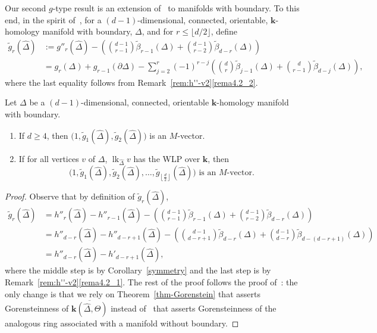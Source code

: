 \documentclass[ALCO,ThmDefs,Unicode,epreuves]{cedram}
\DeclareMathOperator\lk{lk}
\newcommand{\complet}[1]{\hat{#1}}
\newcommand{\field}{\mathbf{k}}
\newcommand{\halffloor}{\left\lfloor \frac{d}{2}\right\rfloor}
\begin{document}
Our second $g$-type result is an extension of~\cite[Theorem~5.4(i)]{Murai-Nevo-14} to manifolds with boundary. To this end, in the spirit of~\cite[Section~5]{Murai-Nevo-14}, for a $(d-1)$-dimensional, connected, orientable, $\field$-homology manifold with boundary, $\Delta$, and for $r\leq \lfloor d/2\rfloor$, define 
\begin{align} 
\tilde{g}_r(\complet{\Delta})&:=g''_r(\complet{\Delta})-\left(\binom{d-1}{r-1}\tilde{\beta}_{r-1}(\Delta)+\binom{d-1}{r-2}\tilde{\beta}_{d-r}(\Delta)\right)\\
&=g_r(\Delta)+g_{r-1}(\partial\Delta)-\sum_{j=2}^r(-1)^{r-j}\left(\binom{d}{r}\tilde{\beta}_{j-1}(\Delta)+ \binom{d}{r-1}\tilde{\beta}_{d-j}(\Delta)\right), \label{g-tilde}
\end{align}
where the last equality follows from Remark~\ref{rem:h''-v2}\eqref{rema4.2_2}.

\begin{theorem} \label{g-theorem-v2}
Let $\Delta$ be a $(d-1)$-dimensional, connected, orientable $\field$-homology manifold with boundary. 
\begin{enumerate}
\item\label{theo5.3_1} If $d\geq 4$, then $\big(1, \tilde{g}_1(\complet{\Delta}), \tilde{g}_2(\complet{\Delta})\big)$ is an $M$-vector.
\item\label{theo5.3_2} If for all vertices $v$ of $\Delta$, $\lk_{\complet{\Delta}}v$ has the WLP over $\field$, then 
\[
\big(1, \tilde{g}_1(\complet{\Delta}), \tilde{g}_2(\complet{\Delta}), \ldots, \tilde{g}_{\halffloor}(\complet{\Delta})\big) \text{ is an $M$-vector.}
\]
\end{enumerate}
\end{theorem}
\begin{proof}
Observe that by definition of $\tilde{g}_r(\complet{\Delta})$,
\begin{align} \nonumber
\tilde{g}_r(\complet{\Delta})&=h''_r(\complet{\Delta})-h''_{r-1}(\complet{\Delta})-\left(\binom{d-1}{r-1}\tilde{\beta}_{r-1}(\Delta)+\binom{d-1}{r-2}\tilde{\beta}_{d-r}(\Delta)\right)\\
\nonumber
&=h''_{d-r}(\complet{\Delta})-h''_{d-r+1}(\complet{\Delta})-\left(\binom{d-1}{d-r+1}\tilde{\beta}_{d-r}(\Delta)+\binom{d-1}{d-r}\tilde{\beta}_{d-(d-r+1)}(\Delta)\right)\\
\label{tilde-g-and-h'}
&=h''_{d-r}(\complet{\Delta})-h'_{d-r+1}(\complet{\Delta}),
\end{align}
where the middle step is by Corollary~\ref{symmetry} and the last step is by Remark~\ref{rem:h''-v2}\eqref{rema4.2_1}. The rest of the proof follows the proof of~\cite[Theorem~5.4(i)]{Murai-Nevo-14}: the only change is that we rely on Theorem~\ref{thm-Gorenstein} that asserts Gorensteinness of $\overline{\field(\complet{\Delta},\Theta)}$ instead of~\cite[Theorem~1.4]{Novik-Swartz-09:Gorenstein} that asserts Gorensteinness of the analogous ring associated with a manifold without boundary.
\end{proof}
\end{document}
